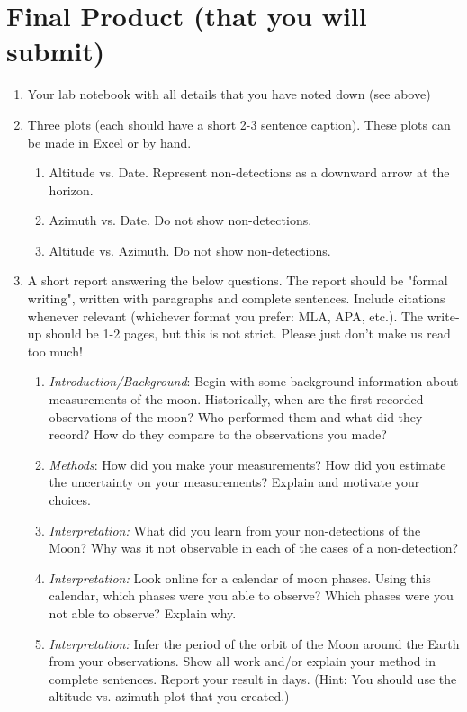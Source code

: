 \documentclass[11pt]{article}
\begin{document}
\section*{Final Product (that you will submit)}
\label{sec:orgce67720}
\begin{enumerate}
\item Your lab notebook with all details that you have noted down (see above)
\item Three plots (each should have a short 2-3 sentence caption). These plots can be made
in Excel or by hand.
\begin{enumerate}
\item Altitude vs. Date. Represent non-detections as a downward arrow at the horizon.
\item Azimuth vs. Date. Do not show non-detections.
\item Altitude vs. Azimuth. Do not show non-detections.
\end{enumerate}
\item A short  report answering the below questions. The report should be "formal writing",
written with paragraphs and complete sentences. Include citations whenever relevant (whichever
format you prefer: MLA, APA, etc.). The write-up should be 1-2 pages, but this
is not strict. Please just don't make us read too much!
\begin{enumerate}
\item \emph{Introduction/Background}: Begin with some background information about measurements of the moon.
Historically, when are the first recorded observations of the moon? Who performed
them and what did they record? How do they compare to the observations you made?
\item \emph{Methods}: How did you make your measurements? How did you estimate the uncertainty on your
measurements? Explain and motivate your choices.
\item \emph{Interpretation:} What did you learn from your non-detections of the Moon? Why was it not observable
in each of the cases of a non-detection?
\item \emph{Interpretation:} Look online for a calendar of moon phases. Using this calendar, which phases were you able
to observe? Which phases were you not able to observe? Explain why.
\item \emph{Interpretation:} Infer the period of the orbit of the Moon around the Earth from your
observations. Show all work and/or explain your method in complete sentences.
Report your result in days. (Hint: You should use the altitude vs. azimuth
plot that you created.)
\end{enumerate}
\end{enumerate}
\end{document}
